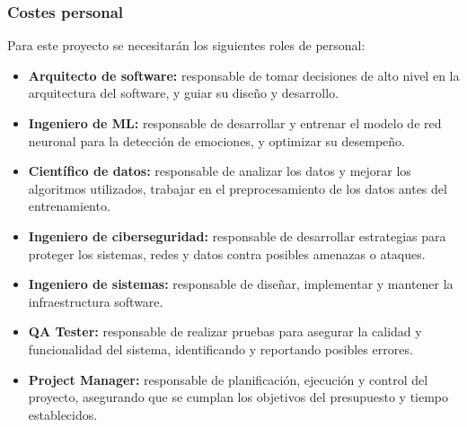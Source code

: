 \documentclass[12pt]{report} %
\begin{document}
\subsubsection{Costes personal}

Para este proyecto se necesitarán los siguientes roles de personal:

\begin{itemize}

    \item \textbf{Arquitecto de software:} responsable de tomar decisiones de alto nivel en la arquitectura del software, y guiar su diseño y desarrollo.
    \item \textbf{Ingeniero de ML:} responsable de desarrollar y entrenar el modelo de red neuronal para la detección de emociones, y optimizar su desempeño.
    \item \textbf{Científico de datos:} responsable de analizar los datos y mejorar los algoritmos utilizados, trabajar en el preprocesamiento de los datos antes del entrenamiento.
	\item \textbf{Ingeniero de ciberseguridad:} responsable de desarrollar estrategias para proteger los sistemas, redes y datos contra posibles amenazas o ataques.
	\item \textbf{Ingeniero de sistemas:} responsable de diseñar, implementar y mantener la infraestructura software.
    \item \textbf{QA Tester:} responsable de realizar pruebas para asegurar la calidad y funcionalidad del sistema, identificando y reportando posibles errores.
    \item \textbf{Project Manager:} responsable de planificación, ejecución y control del proyecto, asegurando que se cumplan los objetivos del presupuesto y tiempo establecidos.

\end{itemize}
\end{document}
